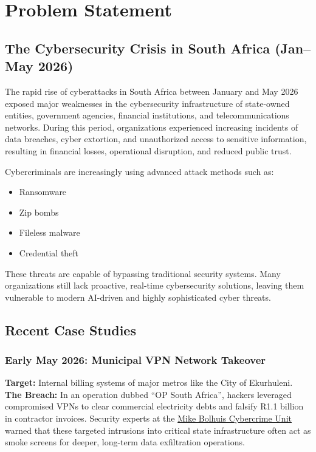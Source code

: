 \documentclass[12pt,letterpaper]{report}
\begin{document}
\chapter{Problem Statement}
\section{The Cybersecurity Crisis in South Africa (Jan--May 2026)}
The rapid rise of cyberattacks in South Africa between January and May 2026 exposed major weaknesses in the cybersecurity infrastructure of state-owned entities, government agencies, financial institutions, and telecommunications networks. During this period, organizations experienced increasing incidents of data breaches, cyber extortion, and unauthorized access to sensitive information, resulting in financial losses, operational disruption, and reduced public trust.

Cybercriminals are increasingly using advanced attack methods such as:
\begin{itemize}
    \item Ransomware
    \item Zip bombs
    \item Fileless malware
    \item Credential theft
\end{itemize}

These threats are capable of bypassing traditional security systems. Many organizations still lack proactive, real-time cybersecurity solutions, leaving them vulnerable to modern AI-driven and highly sophisticated cyber threats.

\section{Recent Case Studies}
\subsection{Early May 2026: Municipal VPN Network Takeover}
\textbf{Target:} Internal billing systems of major metros like the City of Ekurhuleni. \\
\textbf{The Breach:} In an operation dubbed ``OP South Africa'', hackers leveraged compromised VPNs to clear commercial electricity debts and falsify R1.1 billion in contractor invoices. Security experts at the \href{https://www.mikebolhuis.co.za/post/success-project-sss-neutralises-data-breach-recovers-critical-infrastructure-within-13-minutes}{Mike Bolhuis Cybercrime Unit} warned that these targeted intrusions into critical state infrastructure often act as smoke screens for deeper, long-term data exfiltration operations.
\end{document}
